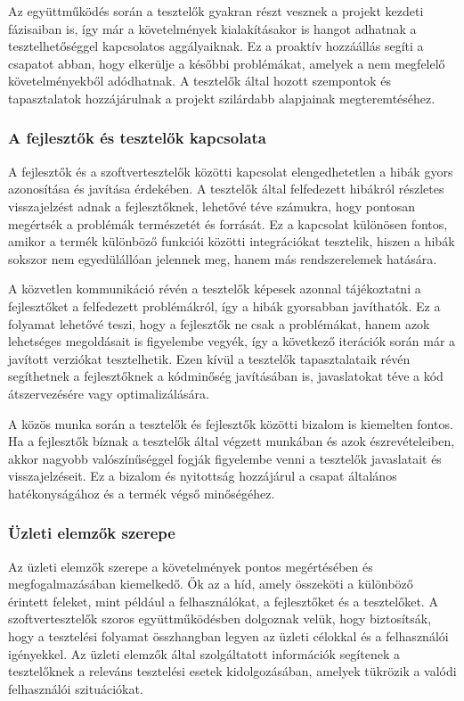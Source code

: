 Az együttműködés során a tesztelők gyakran részt vesznek a projekt kezdeti fázisaiban is, így már a követelmények kialakításakor is hangot adhatnak a tesztelhetőséggel kapcsolatos aggályaiknak. Ez a proaktív hozzáállás segíti a csapatot abban, hogy elkerülje a későbbi problémákat, amelyek a nem megfelelő követelményekből adódhatnak. A tesztelők által hozott szempontok és tapasztalatok hozzájárulnak a projekt szilárdabb alapjainak megteremtéséhez.

\subsubsection{A fejlesztők és tesztelők kapcsolata}
A fejlesztők és a szoftvertesztelők közötti kapcsolat elengedhetetlen a hibák gyors azonosítása és javítása érdekében. A tesztelők által felfedezett hibákról részletes visszajelzést adnak a fejlesztőknek, lehetővé téve számukra, hogy pontosan megértsék a problémák természetét és forrását. Ez a kapcsolat különösen fontos, amikor a termék különböző funkciói közötti integrációkat tesztelik, hiszen a hibák sokszor nem egyedülállóan jelennek meg, hanem más rendszerelemek hatására.

A közvetlen kommunikáció révén a tesztelők képesek azonnal tájékoztatni a fejlesztőket a felfedezett problémákról, így a hibák gyorsabban javíthatók. Ez a folyamat lehetővé teszi, hogy a fejlesztők ne csak a problémákat, hanem azok lehetséges megoldásait is figyelembe vegyék, így a következő iterációk során már a javított verziókat tesztelhetik. Ezen kívül a tesztelők tapasztalataik révén segíthetnek a fejlesztőknek a kódminőség javításában is, javaslatokat téve a kód átszervezésére vagy optimalizálására.

A közös munka során a tesztelők és fejlesztők közötti bizalom is kiemelten fontos. Ha a fejlesztők bíznak a tesztelők által végzett munkában és azok észrevételeiben, akkor nagyobb valószínűséggel fogják figyelembe venni a tesztelők javaslatait és visszajelzéseit. Ez a bizalom és nyitottság hozzájárul a csapat általános hatékonyságához és a termék végső minőségéhez.

\subsubsection{Üzleti elemzők szerepe}
Az üzleti elemzők szerepe a követelmények pontos megértésében és megfogalmazásában kiemelkedő. Ők az a híd, amely összeköti a különböző érintett feleket, mint például a felhasználókat, a fejlesztőket és a tesztelőket. A szoftvertesztelők szoros együttműködésben dolgoznak velük, hogy biztosítsák, hogy a tesztelési folyamat összhangban legyen az üzleti célokkal és a felhasználói igényekkel. Az üzleti elemzők által szolgáltatott információk segítenek a tesztelőknek a releváns tesztelési esetek kidolgozásában, amelyek tükrözik a valódi felhasználói szituációkat.

